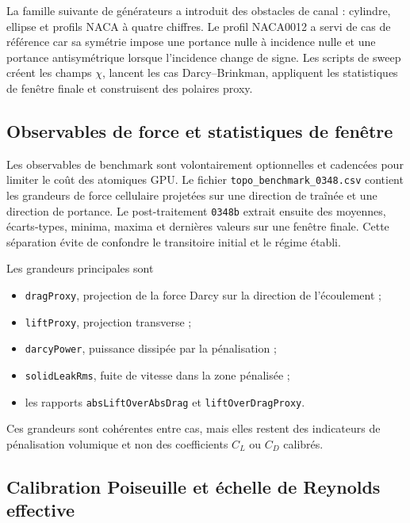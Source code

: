 \documentclass[11pt,a4paper]{article}
\begin{document}
La famille suivante de générateurs a introduit des obstacles de canal : cylindre, ellipse et profils NACA à quatre chiffres. Le profil NACA0012 a servi de cas de référence car sa symétrie impose une portance nulle à incidence nulle et une portance antisymétrique lorsque l'incidence change de signe. Les scripts de sweep créent les champs $\chi$, lancent les cas Darcy--Brinkman, appliquent les statistiques de fenêtre finale et construisent des polaires proxy.

\subsection{Observables de force et statistiques de fenêtre}

Les observables de benchmark sont volontairement optionnelles et cadencées pour limiter le coût des atomiques GPU. Le fichier \texttt{topo\_benchmark\_0348.csv} contient les grandeurs de force cellulaire projetées sur une direction de traînée et une direction de portance. Le post-traitement \texttt{0348b} extrait ensuite des moyennes, écarts-types, minima, maxima et dernières valeurs sur une fenêtre finale. Cette séparation évite de confondre le transitoire initial et le régime établi.

Les grandeurs principales sont
\begin{itemize}[leftmargin=*]
  \item \texttt{dragProxy}, projection de la force Darcy sur la direction de l'écoulement ;
  \item \texttt{liftProxy}, projection transverse ;
  \item \texttt{darcyPower}, puissance dissipée par la pénalisation ;
  \item \texttt{solidLeakRms}, fuite de vitesse dans la zone pénalisée ;
  \item les rapports \texttt{absLiftOverAbsDrag} et \texttt{liftOverDragProxy}.
\end{itemize}
Ces grandeurs sont cohérentes entre cas, mais elles restent des indicateurs de pénalisation volumique et non des coefficients $C_L$ ou $C_D$ calibrés.

\subsection{Calibration Poiseuille et échelle de Reynolds effective}
\end{document}
